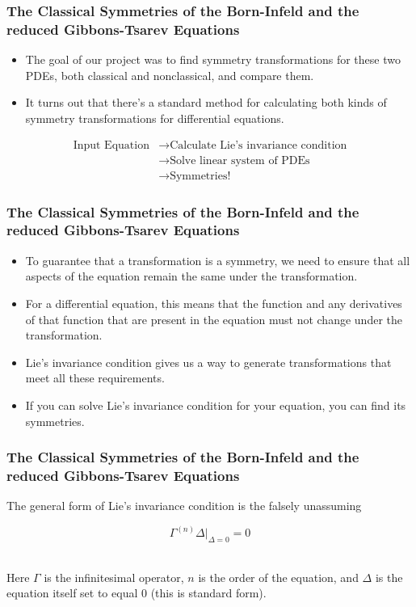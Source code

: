 \documentclass{beamer}
\begin{document}
\begin{frame}
    \frametitle{The Classical Symmetries of the Born-Infeld and the reduced Gibbons-Tsarev Equations}
    \begin{itemize}
        \item The goal of our project was to find symmetry transformations for these two PDEs, both classical and nonclassical, and compare them.
        \item It turns out that there's a standard method for calculating both kinds of symmetry transformations for differential equations.
    \end{itemize}
    \vspace*{0.125in}
    \begin{large}
        \begin{align*}
            \text{Input Equation} &\rightarrow \text{Calculate Lie's invariance condition} \\
                           &\rightarrow \text{Solve linear system of PDEs} \\
                           &\rightarrow \text{Symmetries!}
        \end{align*}
    \end{large}

\end{frame}


\begin{frame}
    \frametitle{The Classical Symmetries of the Born-Infeld and the reduced Gibbons-Tsarev Equations}
    \begin{itemize}
        \item To guarantee that a transformation is a symmetry, we need to ensure that all aspects of the equation remain the same under the transformation. \pause
        \item For a differential equation, this means that the function and any derivatives of that function that are present in the equation must not change under the transformation. \pause
        \item Lie's invariance condition gives us a way to generate transformations that meet all these requirements. \pause
        \item If you can solve Lie's invariance condition for your equation, you can find its symmetries.
    \end{itemize}
\end{frame}


\begin{frame}
    \frametitle{The Classical Symmetries of the Born-Infeld and the reduced Gibbons-Tsarev Equations}
        The general form of Lie's invariance condition is the falsely unassuming
        \vspace*{0.25in}
        \begin{Large}$$\Gamma^{(n)}\Delta |_{\Delta=0} = 0$$\end{Large}\\
        \vspace*{0.25in}
        Here $\Gamma$ is the infinitesimal operator, $n$ is the order of the equation, and $\Delta$ is the equation itself set to equal 0 (this is standard form).
\end{frame}
\end{document}
